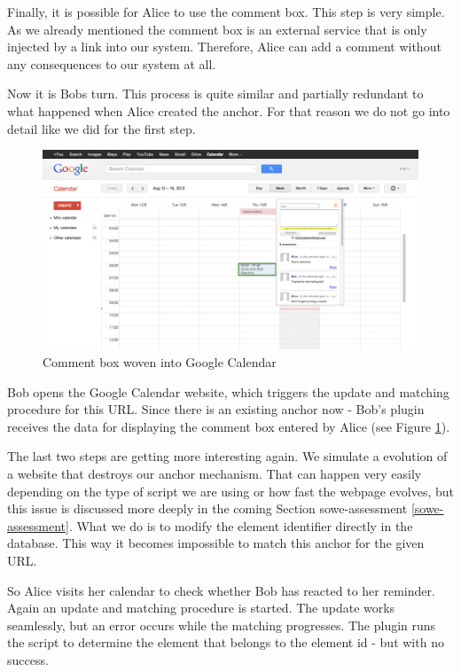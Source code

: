 Finally, it is possible for Alice to use the comment box. This step is very simple. As we already mentioned the comment box is an external service that is only injected by a link into our system. Therefore, Alice can add a comment without any consequences to our system at all.

Now it is Bobs turn. This process is quite similar and partially redundant to what happened when Alice created the anchor. For that reason we do not go into detail like we did for the first step.

\begin{figure}\centering
	\includegraphics[width=13cm]{images/gcal-combined.png}
\caption{Comment box woven into Google Calendar}
\label{gcal-combined}
\end{figure}

Bob opens the Google Calendar website, which triggers the update and matching procedure for this URL. Since there is an existing anchor now - Bob's plugin receives the data for displaying the comment box entered by Alice (see Figure \ref{gcal-combined}). 

The last two steps are getting more interesting again. We simulate a evolution of a website that destroys our anchor mechanism. That can happen very easily depending on the type of script we are using or how fast the webpage evolves, but this issue is discussed more deeply in the coming Section \refname{sowe-assessment} \ref{sowe-assessment}. What we do is to modify the element identifier directly in the database. This way it becomes impossible to match this anchor for the given URL. 

So Alice visits her calendar to check whether Bob has reacted to her reminder. Again an update and matching procedure is started. The update works seamlessly, but an error occurs while the matching progresses. The plugin runs the script to determine the element that belongs to the element id - but with no success. 

